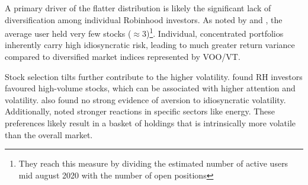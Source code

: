     
A primary driver of the flatter distribution is likely the significant lack of diversification among individual Robinhood investors. As noted by \cite{Fedyk2024} and \cite{Welch2022}, the average user held very few stocks ($\approx3$)\footnote{They reach this measure by dividing the estimated number of active users mid august 2020 with the number of open positions}. 
Individual, concentrated portfolios inherently carry high idiosyncratic risk, leading to much greater return variance compared to diversified market indices represented by VOO/VT.
    
Stock selection tilts further contribute to the higher volatility. \cite{Welch2022} found RH investors favoured high-volume stocks, which can be associated with higher attention and volatility. 
\cite{Fedyk2024} also found no strong evidence of aversion to idiosyncratic volatility. Additionally, \cite{Ardia2023Fast} noted stronger reactions in specific sectors like energy. These preferences likely result in a basket of holdings that is intrinsically more volatile than the overall market.
